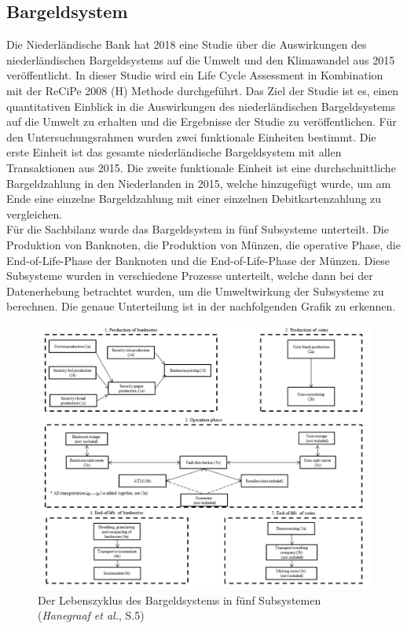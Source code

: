 \documentclass[12pt]{article}
\begin{document}
\subsection{Bargeldsystem}
Die Niederländische Bank hat 2018 eine Studie über die Auswirkungen des niederländischen Bargeldsystems auf die Umwelt und den Klimawandel aus 2015 veröffentlicht. In dieser Studie wird ein Life Cycle Assessment in Kombination mit der ReCiPe 2008 (H) Methode durchgeführt. Das Ziel der Studie ist es, einen quantitativen Einblick in die Auswirkungen des niederländischen Bargeldsystems auf die Umwelt zu erhalten und die Ergebnisse der Studie zu veröffentlichen. Für den Untersuchungsrahmen wurden zwei funktionale Einheiten bestimmt. Die erste Einheit ist das gesamte niederländische Bargeldsystem mit allen Transaktionen aus 2015. Die zweite funktionale Einheit ist eine durchschnittliche Bargeldzahlung in den Niederlanden in 2015, welche hinzugefügt wurde, um am Ende eine einzelne Bargeldzahlung mit einer einzelnen Debitkartenzahlung zu vergleichen.\\
Für die Sachbilanz wurde das Bargeldsystem in fünf Subsysteme unterteilt. Die Produktion von Banknoten, die Produktion von Münzen, die operative Phase, die End-of-Life-Phase der Banknoten und die End-of-Life-Phase der Münzen. Diese Subsysteme wurden in verschiedene Prozesse unterteilt, welche dann bei der Datenerhebung betrachtet wurden, um die Umweltwirkung der Subsysteme zu berechnen. Die genaue Unterteilung ist in der nachfolgenden Grafik zu erkennen.
\FloatBarrier
\begin{figure}[ht!]
    \centering
    \includegraphics[width=\textwidth]{quellen/bgsys.png}
    \caption[Der Lebenszyklus des Bargeldsystems in fünf Subsystemen]{Der Lebenszyklus des Bargeldsystems in fünf Subsystemen (\textit{Hanegraaf et al.}, S.5)}
\end{figure}
\end{document}
